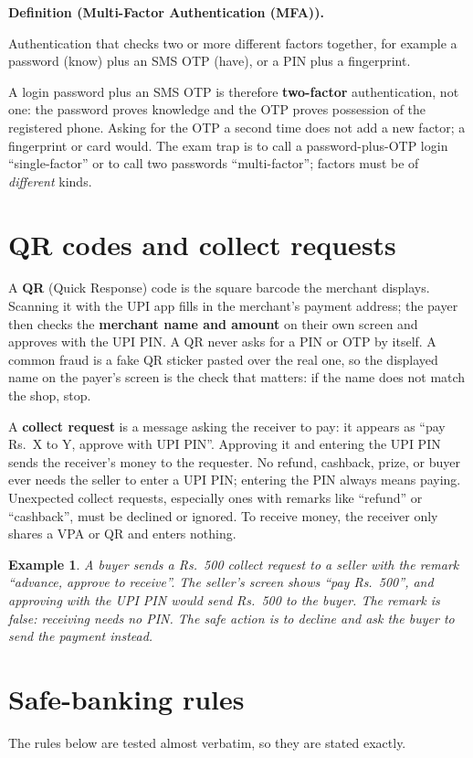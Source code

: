 \documentclass[11pt]{article}
\newtheorem{example}{Example}[section]
\newenvironment{definitionbox}[1]{%
  \par\noindent\textbf{Definition (#1).}\ \itshape
}{\par\vspace{0.3em}}
\begin{document}
\begin{definitionbox}{Multi-Factor Authentication (MFA)}
Authentication that checks two or more different factors together, for
example a password (know) plus an SMS OTP (have), or a PIN plus a
fingerprint.
\end{definitionbox}

A login password plus an SMS OTP is therefore \textbf{two-factor}
authentication, not one: the password proves knowledge and the OTP proves
possession of the registered phone. Asking for the OTP a second time does
not add a new factor; a fingerprint or card would. The exam trap is to call a
password-plus-OTP login ``single-factor'' or to call two passwords
``multi-factor''; factors must be of \emph{different} kinds.

\section{QR codes and collect requests}
A \textbf{QR} (Quick Response) code is the square barcode the merchant
displays. Scanning it with the UPI app fills in the merchant's payment
address; the payer then checks the \textbf{merchant name and amount} on
their own screen and approves with the UPI PIN. A QR never asks for a PIN or
OTP by itself. A common fraud is a fake QR sticker pasted over the real one,
so the displayed name on the payer's screen is the check that matters: if
the name does not match the shop, stop.

A \textbf{collect request} is a message asking the receiver to pay: it
appears as ``pay Rs.\ X to Y, approve with UPI PIN''. Approving it and
entering the UPI PIN sends the receiver's money to the requester. No refund,
cashback, prize, or buyer ever needs the seller to enter a UPI PIN; entering
the PIN always means paying. Unexpected collect requests, especially ones
with remarks like ``refund'' or ``cashback'', must be declined or ignored.
To receive money, the receiver only shares a VPA or QR and enters nothing.

\begin{example}
A buyer sends a Rs.\ 500 collect request to a seller with the remark
``advance, approve to receive''. The seller's screen shows ``pay Rs.\ 500'',
and approving with the UPI PIN would send Rs.\ 500 to the buyer. The remark
is false: receiving needs no PIN. The safe action is to decline and ask the
buyer to send the payment instead.
\end{example}

\section{Safe-banking rules}
The rules below are tested almost verbatim, so they are stated exactly.
\end{document}
